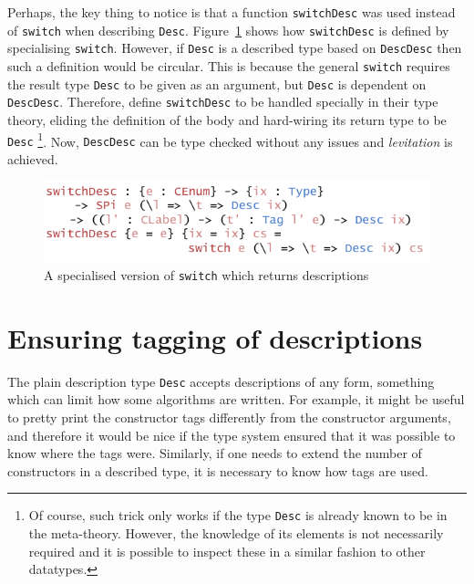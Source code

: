 \documentclass{ituthesis}
\newcommand{\tttype}[1]{\textcolor{type-color}{\texttt{#1}}}
\newcommand{\ttdec}[1]{\textcolor{declared-var-color}{\texttt{#1}}}
\theoremstyle{break}
\begin{document}
Perhaps, the key thing to notice is that a function \ttdec{switchDesc} was used instead of \ttdec{switch} when describing \tttype{Desc}.
Figure~\ref{fig:switchdesc} shows how \ttdec{switchDesc} is defined by specialising \ttdec{switch}. However, if \tttype{Desc} is a described type based on \ttdec{DescDesc} then such a definition would be circular.
This is because the general \ttdec{switch} requires the result type \tttype{Desc} to be given as an argument, but \tttype{Desc} is dependent on \ttdec{DescDesc}. Therefore, \textcite{Chapman:2010:GAL:1863543.1863547} define \ttdec{switchDesc} to be handled specially in their type theory, eliding the definition of the body
and hard-wiring its return type to be \tttype{Desc}
\footnote{Of course, such trick only works if the type \tttype{Desc} is already known to be in the meta-theory.
However, the knowledge of its elements is not necessarily required and it is possible to inspect these in a similar fashion to other datatypes.}.
Now, \ttdec{DescDesc} can be type checked without any issues and \textit{levitation} is achieved.

\begin{figure}[H]
\begin{center}
    \includegraphics[scale=0.5]{Figures/AConstructiveChoiceDesc.png}
\end{center}
\caption{A specialised version of \ttdec{switch} which returns descriptions}
\label{fig:switchdesc}
\end{figure}

\section{Ensuring tagging of descriptions}
\label{sec:Ensuring tagging of descriptions}
The plain description type \tttype{Desc} accepts descriptions of any form, something which can limit how some algorithms are written.
For example, it might be useful to pretty print the constructor tags differently from the constructor arguments, and therefore it would be nice if the type system ensured
that it was possible to know where the tags were.
Similarly, if one needs to extend the number of constructors in a described type, it is necessary to know how tags are used.
\end{document}
